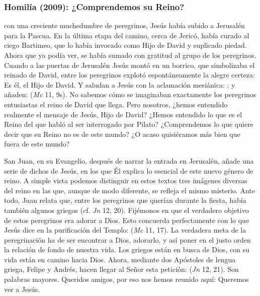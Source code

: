 \newpage

\subsubsection{Homilía (2009): ¿Comprendemos su Reino?}


\begin{body}
 con una creciente muchedumbre de peregrinos, Jesús había subido a Jerusalén para la Pascua. En la última etapa del camino, cerca de Jericó, había curado al ciego Bartimeo, que lo había invocado como Hijo de David y suplicado piedad. Ahora que ya podía ver, se había sumado con gratitud al grupo de los peregrinos. Cuando a las puertas de Jerusalén Jesús montó en un borrico, que simbolizaba el reinado de David, entre los peregrinos explotó espontáneamente la alegre certeza: Es él, el Hijo de David. Y saludan a Jesús con la aclamación mesiánica: ; y añaden:  (\textit{Mc} 11, 9s). No sabemos cómo se imaginaban exactamente los peregrinos entusiastas el reino de David que llega. Pero nosotros, ¿hemos entendido realmente el mensaje de Jesús, Hijo de David? ¿Hemos entendido lo que es el Reino del que habló al ser interrogado por Pilato? ¿Comprendemos lo que quiere decir que su Reino no es de este mundo? ¿O acaso quisiéramos más bien que fuera de este mundo?

San Juan, en su Evangelio, después de narrar la entrada en Jerusalén, añade una serie de dichos de Jesús, en los que Él explica lo esencial de este nuevo género de reino. A simple vista podemos distinguir en estos textos tres imágenes diversas del reino en las que, aunque de modo diferente, se refleja el mismo misterio. Ante todo, Juan relata que, entre los peregrinos que querían  durante la fiesta, había también algunos griegos (cf. \textit{Jn }12, 20). Fijémonos en que el verdadero objetivo de estos peregrinos era adorar a Dios. Esto concuerda perfectamente con lo que Jesús dice en la purificación del Templo:  (\textit{Mc} 11, 17). La verdadera meta de la peregrinación ha de ser encontrar a Dios, adorarlo, y así poner en el justo orden la relación de fondo de nuestra vida. Los griegos están en busca de Dios, con su vida están en camino hacia Dios. Ahora, mediante dos Apóstoles de lengua griega, Felipe y Andrés, hacen llegar al Señor esta petición:  (\textit{Jn} 12, 21). Son palabras mayores. Queridos amigos, por eso nos hemos reunido aquí: Queremos ver a Jesús. 


\end{body}
